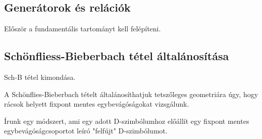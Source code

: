 \documentclass[12pt,magyar,a4paper]{article}
\begin{document}
\subsection{Generátorok és relációk}
Először a fundamentális tartományt kell felépíteni.

\subsection{Schönfliess-Bieberbach tétel általánosítása}
Sch-B tétel kimondása.

A Schönflies-Bieberbach tételt általánosíthatjuk tetszőleges geometriára
úgy, hogy rácsok helyett fixpont mentes egybevágóságokat vizsgálunk.

Írunk egy módszert, ami egy adott D-szimbólumhoz előállít egy fixpont mentes
egybevágóságcsoportot leíró "felfújt" D-szimbólumot.
\end{document}
